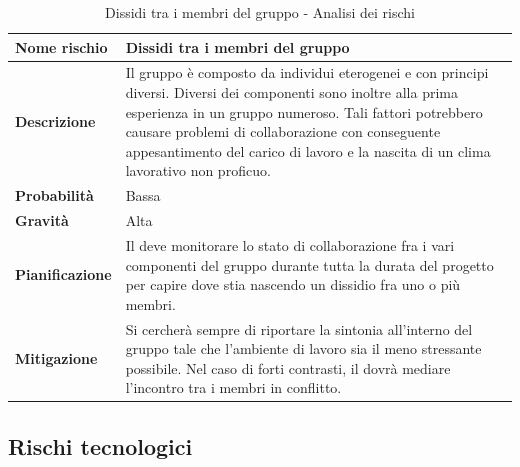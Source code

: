 \documentclass[12pt,a4paper]{article}
\begin{document}
\begin{table}[H]
\begin{center}
\begin{tabular}{p{} p{}}
\toprule
\textbf{Nome rischio} & \textbf{Dissidi tra i membri del gruppo} \\
\midrule
\midrule
\textbf{Descrizione} & Il gruppo è composto da individui eterogenei e con principi diversi. Diversi dei componenti sono inoltre alla prima esperienza in un gruppo numeroso. Tali fattori potrebbero causare problemi di collaborazione con conseguente appesantimento del carico di lavoro e la nascita di un clima lavorativo non proficuo. \\
\midrule
\textbf{Probabilità} & Bassa \\
\midrule
\textbf{Gravità} & Alta \\
\midrule
\textbf{Pianificazione} & Il \PM{} deve monitorare lo stato di collaborazione fra i vari componenti del gruppo durante tutta la durata del progetto per capire dove stia nascendo un dissidio fra uno o più membri. \\
\midrule
\textbf{Mitigazione} & Si cercherà sempre di riportare la sintonia all’interno del gruppo tale che l’ambiente di lavoro sia il meno stressante possibile. Nel caso di forti contrasti, il \PM{} dovrà mediare l’incontro tra i membri in conflitto. \\
\bottomrule
\end{tabular}
\caption{Dissidi tra i membri del gruppo - Analisi dei rischi}
\end{center}
\end{table}

\subsection{Rischi tecnologici}
\end{document}
